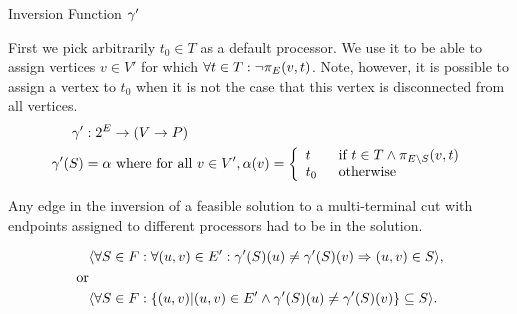 \begin{definition}
Inversion Function $\gamma'$

First we pick arbitrarily $t_0 \in T$ as a default processor.
We use it to be able to assign vertices $v \in V'$ for which $\forall t \in T : \neg\pi_{E}(v, t)$.
Note, however, it is possible to assign a vertex to $t_0$ when it is not the case that this vertex is disconnected from all vertices.
\begin{align}
	\nonumber \gamma' & : 2^E \rightarrow (V \rightarrow P) \\
	\nonumber \gamma'(S) & = \alpha \mbox{ where for all } v \in V', \alpha(v) = \mbox{$\left\{ 
		\begin{array}{l l}
			t \quad & \mbox{if $t \in T \wedge \pi_{E \setminus S}(v, t)$}\\
			t_0 & \mbox{otherwise}\\ \end{array} \right.$} 
\end{align}

\end{definition}

\begin{lemma}
\label{INVERSESUBSET}
Any edge in the inversion of a feasible solution to a multi-terminal cut with endpoints assigned to different processors had to be in the solution.

\begin{align}
	\nonumber & \langle \forall S \in F : \forall (u, v) \in E' : \gamma'(S)(u) \neq \gamma'(S)(v) \Rightarrow (u,v) \in S \rangle ,\\
	\nonumber \mbox{or} &\\
	\nonumber & \langle \forall S \in F : \{(u,v) |(u, v) \in E' \wedge \gamma'(S)(u) \neq \gamma'(S)(v)\} \subseteq S \rangle .
\end{align}
\end{lemma}

